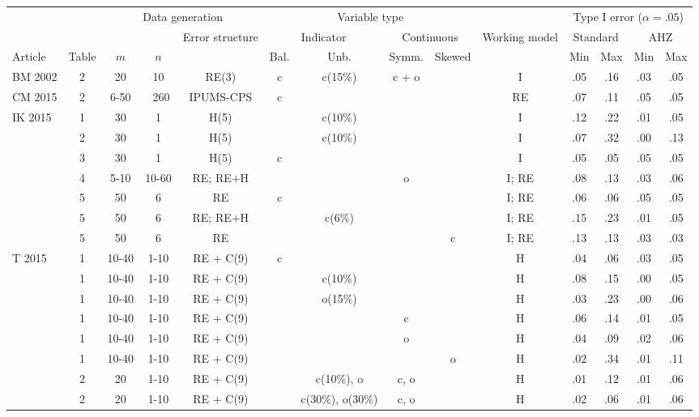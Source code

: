 \begin{tabular}{lc ccc cccc c cccc} 
\toprule
 & & \multicolumn{3}{c}{Data generation}  & \multicolumn{4}{c}{Variable type} & & \multicolumn{4}{c}{Type I error ($\alpha = .05$)} \\
 & & & & \multirow{2}{1.5cm}{Error structure} & \multicolumn{2}{c}{Indicator} & \multicolumn{2}{c}{Continuous} & \multirow{2}{1.5cm}{Working model} & \multicolumn{2}{c}{Standard} & \multicolumn{2}{c}{AHZ} \\ 
Article & Table & $m$ & $n$ & & Bal. & Unb. & Symm. & Skewed & & Min & Max & Min & Max \\ \midrule
BM 2002 & 2 & 20 & 10 & RE(3) & c & c(15\%) & c + o & & I & .05 & .16 & .03 & .05 \\
CM 2015 & 2 & 6-50 & ~260 & IPUMS-CPS & c & & & & RE & .07 & .11 & .05 & .05 \\ \midrule
\multirow{7}{1.5cm}{IK 2015} & 1 & 30 & 1 & H(5) & & c(10\%) & & & I & .12 & .22 & .01 & .05 \\
& 2 & 30 & 1 & H(5) & & c(10\%) & & & I & .07 & .32 & .00 & .13 \\
& 3 & 30 & 1 & H(5) & c & & & & I & .05 & .05 & .05 & .05 \\
& 4 & 5-10 & 10-60 & RE; RE+H & & & o & & I; RE & .08 & .13 & .03 & .06 \\
& 5 & 50 & 6 & RE & c & & & & I; RE & .06 & .06 & .05 & .05 \\ 
& 5 & 50 & 6 & RE; RE+H & & c(6\%) &  & & I; RE & .15 & .23 & .01 & .05 \\
& 5 & 50 & 6 & RE &  & & & c & I; RE & .13 & .13 & .03 & .03 \\ \midrule
\multirow{8}{1.5cm}{T 2015} & 1 & 10-40 & 1-10 & RE + C(9) & c & & & & H & .04 & .06 & .03 & .05 \\
& 1 & 10-40 & 1-10 & RE + C(9) & & c(10\%) & & & H & .08 & .15 & .00 & .05 \\
& 1 & 10-40 & 1-10 & RE + C(9) & & o(15\%) & & & H & .03 & .23 & .00 & .06 \\
& 1 & 10-40 & 1-10 & RE + C(9) & & & c & & H & .06 & .14 & .01 & .05 \\
& 1 & 10-40 & 1-10 & RE + C(9) & & & o & & H & .04 & .09 & .02 & .06 \\ 
& 1 & 10-40 & 1-10 & RE + C(9) & & & & o & H & .02 & .34 & .01 & .11 \\
& 2 & 20 & 1-10 & RE + C(9) & & c(10\%), o & c, o & & H & .01 & .12 & .01 & .06 \\
& 2 & 20 & 1-10 & RE + C(9) & & c(30\%), o(30\%) & c, o & & H & .02 & .06 & .01 & .06 \\
\bottomrule
\end{tabular}



